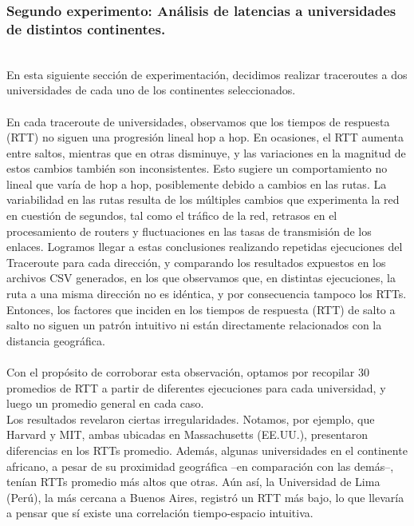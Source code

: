\documentclass{article}
\begin{document}
    
    \subsubsection{Segundo experimento: Análisis de latencias a universidades de distintos continentes.}\\
        En esta siguiente sección de experimentación, decidimos realizar traceroutes a dos universidades de cada uno de los continentes seleccionados.\\
        \\
        En cada traceroute de universidades, observamos que los tiempos de respuesta (RTT) no siguen una progresión lineal hop a hop. En ocasiones, el RTT aumenta entre saltos, mientras que en otras disminuye, y las variaciones en la magnitud de estos cambios también son inconsistentes. Esto sugiere un comportamiento no lineal que varía de hop a hop, posiblemente debido a cambios en las rutas. La variabilidad en las rutas resulta de los múltiples cambios que experimenta la red en cuestión de segundos, tal como el tráfico de la red, retrasos en el procesamiento de routers y fluctuaciones en las tasas de transmisión de los enlaces. Logramos llegar a estas conclusiones realizando repetidas ejecuciones del Traceroute para cada dirección, y comparando los resultados expuestos en los archivos CSV generados, en los que observamos que, en distintas ejecuciones, la ruta a una misma dirección no es idéntica, y por consecuencia tampoco los RTTs.\\
        Entonces, los factores que inciden en los tiempos de respuesta (RTT) de salto a salto no siguen un patrón intuitivo ni están directamente relacionados con la distancia geográfica. \\
        \\
        Con el propósito de corroborar esta observación, optamos por recopilar 30 promedios de RTT a partir de diferentes ejecuciones para cada universidad, y luego un promedio general en cada caso.\\
        Los resultados revelaron ciertas irregularidades. Notamos, por ejemplo, que Harvard y MIT, ambas ubicadas en Massachusetts (EE.UU.), presentaron diferencias en los RTTs promedio. Además, algunas universidades en el continente africano, a pesar de su proximidad geográfica –en comparación con las demás–, tenían RTTs promedio más altos que otras. Aún así, la Universidad de Lima (Perú), la más cercana a Buenos Aires, registró un RTT más bajo, lo que llevaría a pensar que sí existe una correlación tiempo-espacio intuitiva.\\
\end{document}
